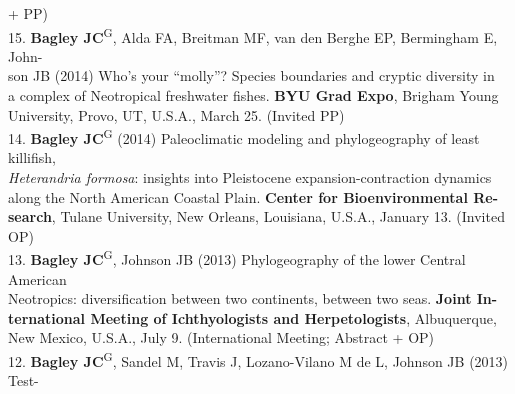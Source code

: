 \documentclass[margin,line]{res}
\begin{document}
\begin{resume}
\hspace*{8mm}+ PP) \\
15. \textbf{Bagley JC}\textsuperscript{G}, Alda FA, Breitman MF, van den Berghe EP, Bermingham E, John-\\
\hspace*{8mm} son JB (2014) Who's your ``molly''?  Species boundaries and cryptic diversity in\\
\hspace*{8mm} a complex of Neotropical freshwater fishes. \textbf{BYU Grad Expo}, Brigham Young\\ \vspace{2mm}
\hspace*{8mm}University, Provo, UT, U.S.A., March 25. (Invited PP) \\
14. \textbf{Bagley JC}\textsuperscript{G} (2014) Paleoclimatic modeling and phylogeography of least killifish,\\
\hspace*{8mm} \emph{Heterandria formosa}: insights into Pleistocene expansion-contraction dynamics\\
\hspace*{8mm} along the North American Coastal Plain. \textbf{Center for Bioenvironmental Re-}\\
\hspace*{8mm} \textbf{search}, Tulane University, New Orleans, Louisiana, U.S.A., January 13. (Invited\\ \vspace{2mm}
\hspace*{8mm}OP) \\
13. \textbf{Bagley JC}\textsuperscript{G}, Johnson JB (2013) Phylogeography of the lower Central American\\
\hspace*{8mm} Neotropics: diversification between two continents, between two seas. \textbf{Joint In-}\\
\hspace*{8mm} \textbf{ternational Meeting of Ichthyologists and Herpetologists}, Albuquerque,\\ \vspace{2mm}
\hspace*{8mm}New Mexico, U.S.A., July 9. (International Meeting; Abstract + OP) \\
12. \textbf{Bagley JC}\textsuperscript{G}, Sandel M, Travis J, Lozano-Vilano M de L, Johnson JB (2013) Test-\\

\end{resume}
\end{document}
